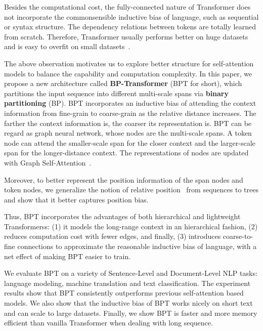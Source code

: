 \documentclass[11pt,a4paper]{article}
\begin{document}
Besides the computational cost, the fully-connected nature of Transformer does not incorporate the commonsensible inductive bias of language, such as sequential or syntax structure. The dependency relations between tokens are totally learned from scratch. Therefore, Transformer usually performs better on huge datasets and is easy to overfit on small datasets~\citep{guo2019startransformer}.

The above observation motivates us to explore better structure for self-attention models to balance the capability and computation complexity. In this paper, we propose a new architecture called \textbf{BP-Transformer} (BPT for short), which partitions the input sequence into different multi-scale spans via \textbf{binary partitioning} (BP). BPT incorporates an inductive bias of attending the context information from fine-grain to coarse-grain as the relative distance increases. The farther the context information is, the coarser its representation is.
BPT can be regard as graph neural network, whose nodes are the multi-scale spans.
A token node can attend the smaller-scale span for the closer context and the larger-scale span for the longer-distance context.
The representations of nodes are updated with Graph Self-Attention~\citep{velickovic2017graph}.





Moreover, to better represent the position information of the span nodes and token nodes, we generalize the notion of relative position~\citep{shaw2018self} from sequences to trees and show that it better captures position bias.

Thus, BPT incorporates the advantages of both hierarchical and lightweight Transformerss: (1) it models the long-range context in an hierarchical fashion, (2) reduces computation cost with fewer edges, and finally, (3) introduces coarse-to-fine connections to approximate the reasonable inductive bias of language, with a net effect of making BPT easier to train.

We evaluate BPT on a variety of Sentence-Level and Document-Level NLP tasks: language modeling, machine translation and text classification. The experiment results show that BPT consistently outperforms previous self-attention based models. We also show that the inductive bias of BPT works nicely on short text and can scale to large datasets. Finally, we show BPT is faster and more memory efficient than vanilla Transformer when dealing with long sequence.
\end{document}

